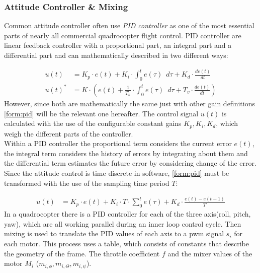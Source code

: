 \newpage

\subsubsection{Attitude Controller \& Mixing} \label{sec:pid}
Common attitude controller often use \emph{PID controller}  as one of the most essential parts of nearly all commercial quadrocopter flight control. PID controller are linear feedback controller with a proportional part, an integral part and a differential part and can mathematically described in two different ways:

\begin{align}
	u(t) &= K_p \cdot e(t) + K_i \cdot \int_{0}^{t} e(\tau) \enspace d\tau + K_d \cdot \frac{de(t)}{dt} \label{form:pid}\\
	u(t)^* &= K \cdot ( e(t) + \frac{1}{T_n} \cdot \int_{0}^{t} e(\tau) \enspace d\tau + T_v \cdot \frac{de(t)}{dt})
\end{align}
\newline
However, since both are mathematically the same just with other gain definitions \cref{form:pid} will be the relevant one hereafter. The control signal $u(t)$ is calculated with the use of the configurable constant gains $K_p, K_i, K_d$, which weigh the different parts of the controller.\\
Within a PID controller the proportional term considers the current error $e(t)$, the integral term considers the history of errors by integrating about them and the differential term estimates the future error by considering change of the error. Since the attitude control is time discrete in software, \cref{form:pid} must be transformed with the use of the sampling time period $T$:

\begin{align}
	u(t) &= K_p \cdot e(t) + K_i \cdot T \cdot \sum_{0}^{t}e(\tau) + K_d \cdot \frac{e(t) - e(t-1)}{T} \label{form:pid2}
\end{align}
\newline
In a quadrocopter there is a PID controller for each of the three axis(roll, pitch, yaw), which are all working parallel during an inner loop control cycle. Then mixing is used to translate the PID values of each axis to a pwm signal $s_i$ for each motor. This process uses a table, which consists of constants that describe the geometry of the frame.  The throttle coefficient $f$ and the mixer values of the motor $M_i$ ($m_{i,\phi}, m_{i,\Theta}, m_{i,\psi}$).

